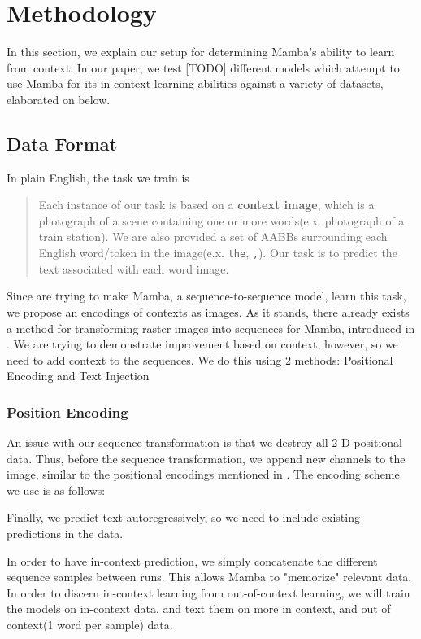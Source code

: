 \section{Methodology}
In this section, we explain our setup for determining Mamba's ability to learn
from context.
In our paper, we test [TODO] different models which attempt to use Mamba for its
in-context learning abilities against a variety of datasets, elaborated on
below.
\subsection{Data Format}
In plain English, the task we train is
\begin{quote}
    Each instance of our task is based on a \textbf{context image}, which
    is a photograph of a scene containing one or more words(e.x. photograph of a
    train station).
    We are also provided a set of AABBs surrounding each English word/token in
    the image(e.x. \verb|the|, \verb|,|).
    Our task is to predict the text associated with each word image.
\end{quote}
Since are trying to make Mamba, a sequence-to-sequence model, learn this task,
we propose an encodings of contexts as images.
As it stands, there already exists a method for transforming raster images into
sequences for Mamba, introduced in \cite{vmamba}.
We are trying to demonstrate improvement based on context, however, so we need
to add context to the sequences. We do this using 2 methods: Positional Encoding
and Text Injection

\subsubsection{Position Encoding}
An issue with our sequence transformation is that we destroy all 2-D positional
data.
Thus, before the sequence transformation, we append new channels to the image,
similar to the positional encodings mentioned in \cite{attention}.
The encoding scheme we use is as follows:

Finally, we predict text autoregressively, so we need to include existing
predictions in the data.


In order to have in-context prediction, we simply concatenate the different
sequence samples between runs. This allows Mamba to "memorize" relevant data.
In order to discern in-context learning from out-of-context learning, we will
train the models on in-context data, and text them on more in context, and out
of context(1 word per sample) data.

